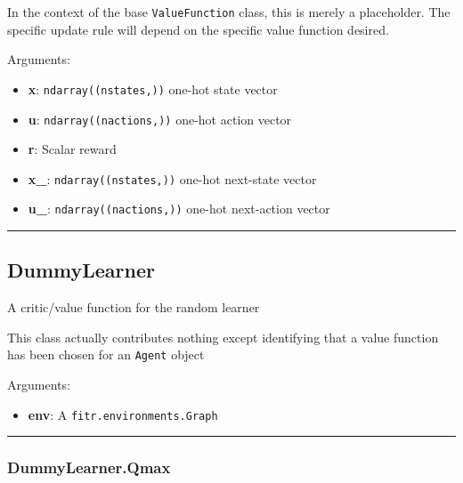 In the context of the base \texttt{ValueFunction} class, this is merely
a placeholder. The specific update rule will depend on the specific
value function desired.

Arguments:

\begin{itemize}
\tightlist
\item
  \textbf{x}: \texttt{ndarray((nstates,))} one-hot state vector
\item
  \textbf{u}: \texttt{ndarray((nactions,))} one-hot action vector
\item
  \textbf{r}: Scalar reward
\item
  \textbf{x\_}: \texttt{ndarray((nstates,))} one-hot next-state vector
\item
  \textbf{u\_}: \texttt{ndarray((nactions,))} one-hot next-action vector
\end{itemize}

\begin{center}\rule{0.5\linewidth}{\linethickness}\end{center}

\subsection{DummyLearner}\label{dummylearner}

\begin{Shaded}
\begin{Highlighting}[]
\end{Highlighting}
\end{Shaded}

A critic/value function for the random learner

This class actually contributes nothing except identifying that a value
function has been chosen for an \texttt{Agent} object

Arguments:

\begin{itemize}
\tightlist
\item
  \textbf{env}: A \texttt{fitr.environments.Graph}
\end{itemize}

\begin{center}\rule{0.5\linewidth}{\linethickness}\end{center}

\subsubsection{DummyLearner.Qmax}\label{dummylearner.qmax}

